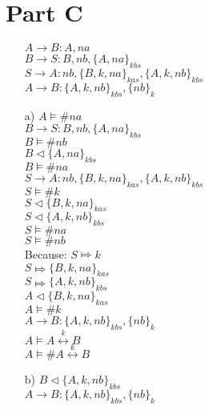 \documentclass[10pt]{article}
\begin{document}
    \section*{Part C}
	\begin{itemize}
		\item[]
			\(A \rightarrow B: A, na\)\\
			\(B \rightarrow S: B, nb, \{A, na\}_{kbs}\)\\
			\(S \rightarrow A: nb, \{B, k, na\}_{kas}, \{A, k, nb\}_{kbs}\)\\
			\(A \rightarrow B: \{A, k, nb\}_{kbs},\{nb\}_{k}\)\\
		\item[a)] 
			\(A \vDash \# na\)\\
			\-\hspace{5mm} \(B \rightarrow S: B, nb, \{A, na\}_{kbs}\)\\
			\(B \vDash \# nb\)\\
			\(B \vartriangleleft \{A, na\}_{kbs}\)\\
			\(B \vDash \# na\)\\
			\-\hspace{5mm} \(S \rightarrow A: nb, \{B, k, na\}_{kas}, \{A, k, nb\}_{kbs}\)\\
			\(S \vDash \# k\)\\
			\(S \vartriangleleft \{B, k, na\}_{kas}\)\\
			\(S \vartriangleleft \{A, k, nb\}_{kbs}\)\\
			\(S \vDash \# na\)\\
			\(S \vDash \# nb\)\\
			Because: \(S \Mapsto k\)\\
			\(S \Mapsto \{B, k, na\}_{kas}\)\\
			\(S \Mapsto \{A, k, nb\}_{kbs}\)\\
			\(A \vartriangleleft \{B, k, na\}_{kas}\)\\
			\(A \vDash \# k\)\\
			\-\hspace{5mm} \(A \rightarrow B: \{A, k, nb\}_{kbs},\{nb\}_{k}\)\\
			\(A \vDash A \overset{k}{\longleftrightarrow} B\)\\
			\(A \vDash \# A \overset{k}{\longleftrightarrow} B\)	
		\item[b)]
			\(B \vartriangleleft \{A, k, nb\}_{kbs}\)\\
			\-\hspace{5mm} \(A \rightarrow B: \{A, k, nb\}_{kbs},\{nb\}_{k}\)\\

\end{itemize}
\end{document}
